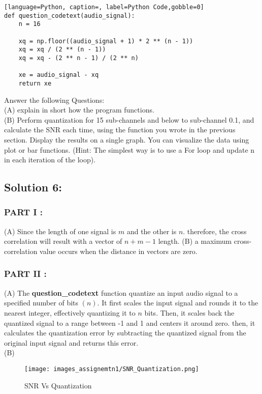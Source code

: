 \documentclass[letterpaper, 12pt]{article}
\begin{document}
\begin{lstlisting}[language=Python, caption=, label=Python Code,gobble=0]
def question_codetext(audio_signal):
    n = 16

    xq = np.floor((audio_signal + 1) * 2 ** (n - 1))
    xq = xq / (2 ** (n - 1))
    xq = xq - (2 ** n - 1) / (2 ** n)

    xe = audio_signal - xq
    return xe
\end{lstlisting} 
 Answer the following Questions: \\
(A) explain in short how the program functions.\\
(B) Perform quantization for 15 sub-channels and below to sub-channel 0.1, and calculate the SNR each time, using the function you wrote in the previous section. Display the results on a single graph. You can visualize the data using plot or bar functions. (Hint: The simplest way is to use a For loop and update n in each iteration of the loop).




\subsection*{Solution 6:}
\subsubsection*{PART I :}
(A) Since the length of one signal is $m$ and the other is $n$. therefore, the cross correlation will result with a vector of $n+m-1$ length.
(B) a maximum cross-correlation value occurs when the distance in vectors are zero.

\subsubsection*{PART II :}
(A) The \textbf{question\_codetext} function quantize an input audio signal to a specified number of bits $(n)$. It first scales the input signal and rounds it to the nearest integer, effectively quantizing it to $n$ bits. Then, it scales back the quantized signal to a range between -1 and 1 and centers it around zero. then, it calculates the quantization error by subtracting the quantized signal from the original input signal and returns this error. \\
(B) 

\begin{figure}[htbp]
    \centering
    \texttt{[image: images\_assignemtn1/SNR\_Quantization.png]}
    \caption{SNR Vs Quantization}
    \label{fig:enter-label}
\end{figure}
\end{document}
